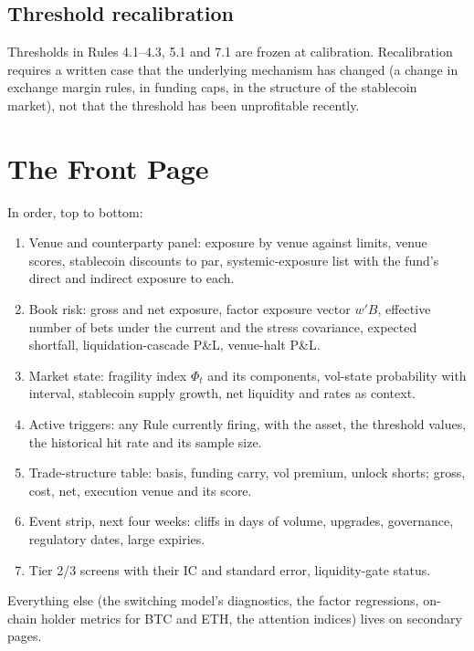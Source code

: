 \documentclass[11pt,a4paper]{article}
\theoremstyle{definition}
\begin{document}
\subsection{Threshold recalibration}

Thresholds in Rules 4.1--4.3, 5.1 and 7.1 are frozen at calibration. Recalibration requires a written case that the underlying mechanism has changed (a change in exchange margin rules, in funding caps, in the structure of the stablecoin market), not that the threshold has been unprofitable recently.

\section{The Front Page}\label{sec:frontpage}

In order, top to bottom:
\begin{enumerate}[nosep]
\item Venue and counterparty panel: exposure by venue against limits, venue scores, stablecoin discounts to par, systemic-exposure list with the fund's direct and indirect exposure to each.
\item Book risk: gross and net exposure, factor exposure vector $w'B$, effective number of bets under the current and the stress covariance, expected shortfall, liquidation-cascade P\&L, venue-halt P\&L.
\item Market state: fragility index $\Phi_t$ and its components, vol-state probability with interval, stablecoin supply growth, net liquidity and rates as context.
\item Active triggers: any Rule currently firing, with the asset, the threshold values, the historical hit rate and its sample size.
\item Trade-structure table: basis, funding carry, vol premium, unlock shorts; gross, cost, net, execution venue and its score.
\item Event strip, next four weeks: cliffs in days of volume, upgrades, governance, regulatory dates, large expiries.
\item Tier 2/3 screens with their IC and standard error, liquidity-gate status.
\end{enumerate}
Everything else (the switching model's diagnostics, the factor regressions, on-chain holder metrics for BTC and ETH, the attention indices) lives on secondary pages.
\end{document}
